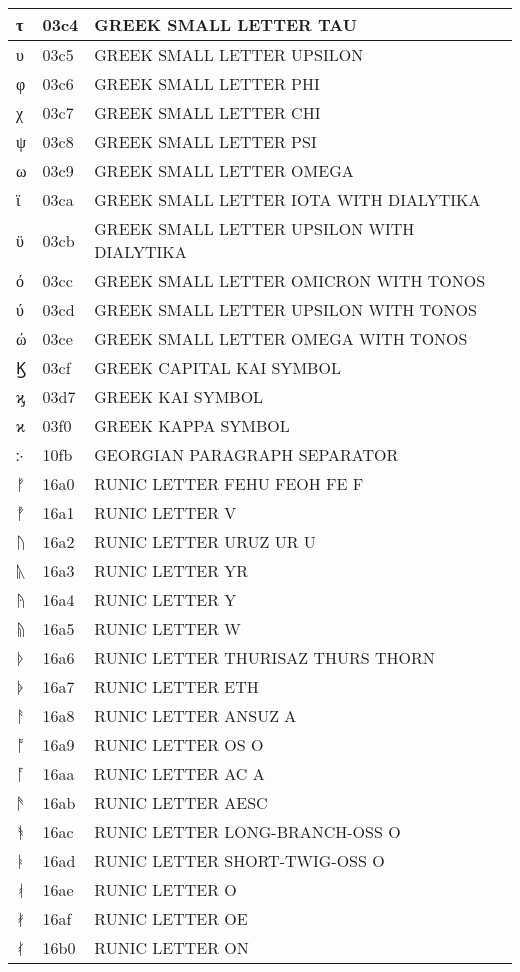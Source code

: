 \documentclass[12pt,letterpaper,openany]{book}
\begin{document}
\begin{center}
\begin{supertabular}{|m{0.25in}|m{0.5in}|m{4in}|}
τ & 03c4 & GREEK SMALL LETTER TAU\\\hline
υ & 03c5 & GREEK SMALL LETTER UPSILON\\\hline
φ & 03c6 & GREEK SMALL LETTER PHI\\\hline
χ & 03c7 & GREEK SMALL LETTER CHI\\\hline
ψ & 03c8 & GREEK SMALL LETTER PSI\\\hline
ω & 03c9 & GREEK SMALL LETTER OMEGA\\\hline
ϊ & 03ca & GREEK SMALL LETTER IOTA WITH DIALYTIKA\\\hline
ϋ & 03cb & GREEK SMALL LETTER UPSILON WITH DIALYTIKA\\\hline
ό & 03cc & GREEK SMALL LETTER OMICRON WITH TONOS\\\hline
ύ & 03cd & GREEK SMALL LETTER UPSILON WITH TONOS\\\hline
ώ & 03ce & GREEK SMALL LETTER OMEGA WITH TONOS\\\hline
Ϗ & 03cf & GREEK CAPITAL KAI SYMBOL\\\hline
ϗ & 03d7 & GREEK KAI SYMBOL\\\hline
ϰ & 03f0 & GREEK KAPPA SYMBOL\\\hline
჻ & 10fb & GEORGIAN PARAGRAPH SEPARATOR\\\hline
ᚠ & 16a0 & RUNIC LETTER FEHU FEOH FE F\\\hline
ᚡ & 16a1 & RUNIC LETTER V\\\hline
ᚢ & 16a2 & RUNIC LETTER URUZ UR U\\\hline
ᚣ & 16a3 & RUNIC LETTER YR\\\hline
ᚤ & 16a4 & RUNIC LETTER Y\\\hline
ᚥ & 16a5 & RUNIC LETTER W\\\hline
ᚦ & 16a6 & RUNIC LETTER THURISAZ THURS THORN\\\hline
ᚧ & 16a7 & RUNIC LETTER ETH\\\hline
ᚨ & 16a8 & RUNIC LETTER ANSUZ A\\\hline
ᚩ & 16a9 & RUNIC LETTER OS O\\\hline
ᚪ & 16aa & RUNIC LETTER AC A\\\hline
ᚫ & 16ab & RUNIC LETTER AESC\\\hline
ᚬ & 16ac & RUNIC LETTER LONG-BRANCH-OSS O\\\hline
ᚭ & 16ad & RUNIC LETTER SHORT-TWIG-OSS O\\\hline
ᚮ & 16ae & RUNIC LETTER O\\\hline
ᚯ & 16af & RUNIC LETTER OE\\\hline
ᚰ & 16b0 & RUNIC LETTER ON\\\hline

\end{supertabular}
\end{center}
\end{document}
